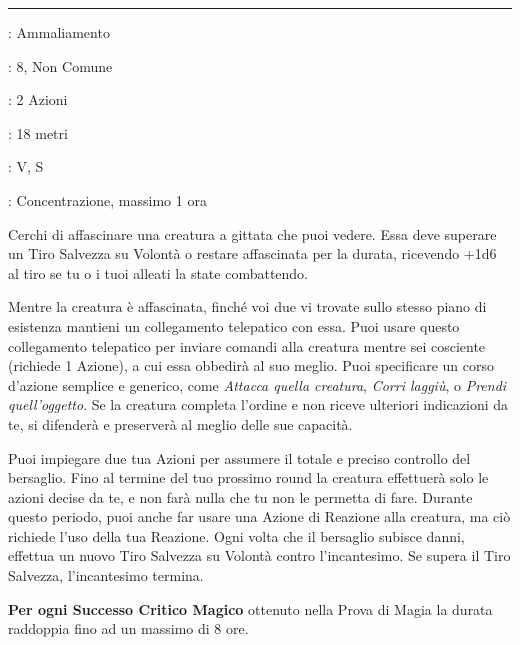 \begin{multicols}{2}
\smallskip\noindent\rule{\linewidth}{2pt} \hypertarget{Dominare Mostri}{}\medskip{}
\noindent
\begin{description}[noitemsep, topsep=0pt, parsep=0pt, partopsep=0pt, leftmargin=0cm, labelwidth=2.8cm]
	\item[\textbf{Lista di Magia}]: Ammaliamento
	\item[\textbf{Livello}]: 8, Non Comune
	\item[\textbf{T. di Lancio}]: 2 Azioni
	\item[\textbf{Gittata}]: 18 metri
	\item[\textbf{Componenti}]: V, S
	\item[\textbf{Durata}]: Concentrazione, massimo 1 ora
\end{description}

Cerchi di affascinare una creatura a gittata che puoi vedere. Essa deve superare un Tiro Salvezza su Volontà o restare affascinata per la durata, ricevendo +1d6 al tiro se tu o i tuoi alleati la state combattendo.

Mentre la creatura è affascinata, finché voi due vi trovate sullo stesso piano di esistenza mantieni un collegamento telepatico con essa. Puoi usare questo collegamento telepatico per inviare comandi alla creatura mentre sei cosciente (richiede 1 Azione), a cui essa obbedirà al suo meglio. Puoi specificare un corso d'azione semplice e generico, come \emph{Attacca quella creatura}, \emph{Corri laggiù}, o \emph{Prendi quell'oggetto}. Se la creatura completa l'ordine e non riceve ulteriori indicazioni da te, si difenderà e preserverà al meglio delle sue capacità.

Puoi impiegare due tua Azioni per assumere il totale e preciso controllo del bersaglio. Fino al termine del tuo prossimo round la creatura effettuerà solo le azioni decise da te, e non farà nulla che tu non le permetta di fare. Durante questo periodo, puoi anche far usare una Azione di Reazione alla creatura, ma ciò richiede l'uso della tua Reazione. Ogni volta che il bersaglio subisce danni, effettua un nuovo Tiro Salvezza su Volontà contro l'incantesimo. Se supera il Tiro Salvezza, l'incantesimo termina.

\textbf{Per ogni Successo Critico Magico} ottenuto nella Prova di Magia la durata raddoppia fino ad un massimo di 8 ore.


\end{multicols}

